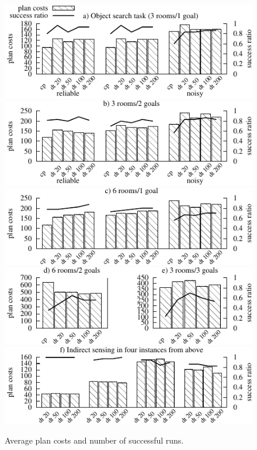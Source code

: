 \documentclass{article}
\begin{document}
\begin{figure}[h!]
  \includegraphics{dora2-quality}\hfill
  \includegraphics{dora3-quality}\hfill
  \includegraphics{dora4-quality}\hfill
  \vspace{2mm}
  \includegraphics{dora56-quality}\hfill
  \vspace{2mm}
  \includegraphics{dora-cat-quality}\hfill
  \caption{Average plan costs and number of successful runs.}
  \label{fig:results-quality}
\end{figure}
\end{document}

